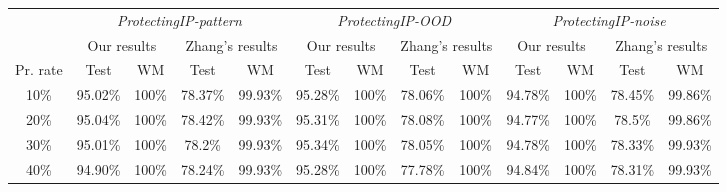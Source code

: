 \begin{table}
{\begin{tabular}{|c|cc|cc|cc|cc|cc|cc|}
                           & \multicolumn{4}{c|}{\textit{ProtectingIP-pattern}}                                               & \multicolumn{4}{c|}{\textit{ProtectingIP-OOD}}                                                   & \multicolumn{4}{c|}{\textit{ProtectingIP-noise}}                                                 \\ \cline{2-13} 
                           & \multicolumn{2}{c|}{Our results}                           & \multicolumn{2}{c|}{Zhang's results} & \multicolumn{2}{c|}{Our results}                           & \multicolumn{2}{c|}{Zhang's results} & \multicolumn{2}{c|}{Our results}                           & \multicolumn{2}{c|}{Zhang's results} \\ \cline{2-13} 
\multirow{-3}{*}{Pr. rate} & \multicolumn{1}{c|}{Test} & WM                             & \multicolumn{1}{c|}{Test} & WM      & \multicolumn{1}{c|}{Test} & WM                             & \multicolumn{1}{c|}{Test} & WM      & \multicolumn{1}{c|}{Test} & WM                             & \multicolumn{1}{c|}{Test} & WM      \\ \hline
10\%                       & 95.02\%                   & {\color[HTML]{036400} 100\%}   & 78.37\%                   & 99.93\% & 95.28\%                   & 100\%                          & 78.06\%                   & 100\%   & 94.78\%                   & 100\%                          & 78.45\%                   & 99.86\% \\
20\%                       & 95.04\%                   & {\color[HTML]{036400} 100\%}   & 78.42\%                   & 99.93\% & 95.31\%                   & 100\%                          & 78.08\%                   & 100\%   & 94.77\%                   & 100\%                          & 78.5\%                    & 99.86\% \\
30\%                       & 95.01\%                   & {\color[HTML]{036400} 100\%}   & 78.2\%                    & 99.93\% & 95.34\%                   & 100\%                          & 78.05\%                   & 100\%   & 94.78\%                   & 100\%                          & 78.33\%                   & 99.93\% \\
40\%                       & 94.90\%                   & {\color[HTML]{036400} 100\%}   & 78.24\%                   & 99.93\% & 95.28\%                   & 100\%                          & 77.78\%                   & 100\%   & 94.84\%                   & 100\%                          & 78.31\%                   & 99.93\% \\

\end{tabular}}
\end{table}
